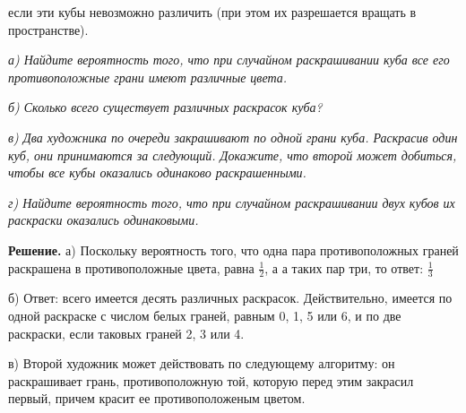 {\begin{multicols}{3}
{если эти кубы невозможно различить (при этом их разрешается
вращать в пространстве).} \par
\textsl{а) Найдите вероятность того, что при случайном раскрашивании куба все
его противоположные грани имеют различные цвета.} \par
\textsl{б) Сколько всего существует различных раскрасок куба?} \par
\textsl{в) Два художника по очереди закрашивают по одной грани куба.
Раскрасив один куб, они принимаются за следующий. Докажите,
что второй может добиться, чтобы все кубы оказались одинаково
раскрашенными.} \par
\textsl{г) Найдите вероятность того, что при случайном раскрашивании двух
кубов их раскраски оказались одинаковыми.} \par
\textbf{Решение.}  а) Поскольку вероятность того, что одна пара
противоположных граней раскрашена в противоположные цвета, равна
$\frac{1}{2}$, а а таких пар три, то ответ: $\frac{1}{3}$ \par
б) Ответ: всего имеется десять различных раскрасок. Действительно,
имеется по одной раскраске с числом белых граней, равным 0, 1, 5 или 6, и
по две раскраски, если таковых граней 2, 3 или 4. \par
в) Второй художник может действовать по следующему алгоритму:
он раскрашивает грань, противоположную той, которую перед этим
закрасил первый, причем красит ее противоположеным цветом.
\end{multicols}}